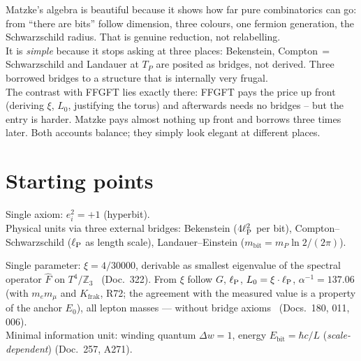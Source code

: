 \begin{tcolorbox}[convbox, title={The shortest version}]
  Matzke's algebra is beautiful because it shows how far pure
  combinatorics can go: from \enquote{there are bits} follow dimension,
  three colours, one fermion generation, the Schwarzschild radius.
  That is genuine reduction, not relabelling.\\[4pt]
  It is \emph{simple} because it stops asking at three places:
  Bekenstein, Compton$\,=\,$Schwarzschild and Landauer at $T_P$ are posited
  as bridges, not derived. Three borrowed bridges to a structure that is
  internally very frugal.\\[4pt]
  The contrast with FFGFT lies exactly there: FFGFT pays the price up front
  (deriving $\xi$, $L_0$, justifying the torus) and afterwards needs no
  bridges -- but the entry is harder. Matzke pays almost nothing up front
  and borrows three times later. Both accounts balance; they simply look
  elegant at different places.
\end{tcolorbox}

\section{Starting points}

\begin{tcolorbox}[matzbox, title={Matzke}]
  Single axiom: $e_i^2 = +1$ (hyperbit). \SETZ\\
  Physical units via three external bridges:
  Bekenstein ($4\ell_{\mathrm{P}}^2$ per bit), Compton--Schwarzschild ($\ell_{\mathrm{P}}$ as length
  scale), Landauer--Einstein ($m_{\mathrm{bit}} = m_P \ln 2/(2\pi)$).
\end{tcolorbox}

\begin{tcolorbox}[ffgftbox, title={FFGFT}]
  Single parameter: $\xi = 4/30000$, derivable as smallest eigenvalue of
  the spectral operator $\hat{F}$ on $T^4/\mathbb{Z}_3$ \K\ (Doc.\ 322).
  From $\xi$ follow $G$, $\ell_{\mathrm{P}}$, $L_0 = \xi\cdot\ell_{\mathrm{P}}$, $\alpha^{-1} = 137.06$ (with $m_e m_\mu$ and $K_{\text{frak}}$, R72; the agreement with the measured value is a property of the anchor $E_0$),
  all lepton masses — without bridge axioms \K\ (Docs.\ 180, 011, 006).\\
  Minimal information unit: winding quantum $\Delta w = 1$, energy
  $E_{\mathrm{bit}} = \hbar c/L$ (\emph{scale-dependent}) (Doc.\ 257, A271).
\end{tcolorbox}

